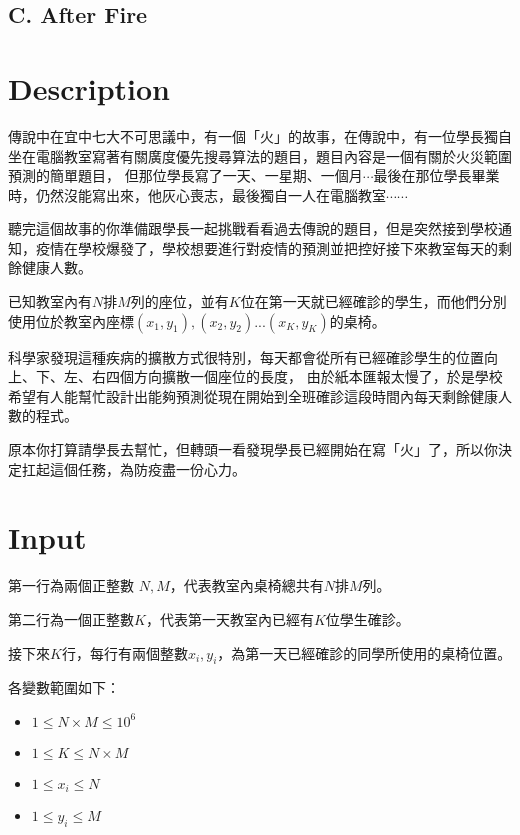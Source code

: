 \documentclass[11pt,a4paper]{article}
\begin{document}
\begin{center}
\section*{C. After Fire}
\end{center}

\section*{Description}


傳說中在宜中七大不可思議中，有一個「火」的故事，在傳說中，有一位學長獨自坐在電腦教室寫著有關廣度優先搜尋算法的題目，題目內容是一個有關於火災範圍預測的簡單題目，
但那位學長寫了一天、一星期、一個月$\cdots$最後在那位學長畢業時，仍然沒能寫出來，他灰心喪志，最後獨自一人在電腦教室$\cdots\cdots$

聽完這個故事的你準備跟學長一起挑戰看看過去傳說的題目，但是突然接到學校通知，疫情在學校爆發了，學校想要進行對疫情的預測並把控好接下來教室每天的剩餘健康人數。

已知教室內有$N$排$M$列的座位，並有$K$位在第一天就已經確診的學生，而他們分別使用位於教室內座標$(x_1, y_1), (x_2, y_2)... (x_K, y_K)$的桌椅。

科學家發現這種疾病的擴散方式很特別，每天都會從所有已經確診學生的位置向上、下、左、右四個方向擴散一個座位的長度，
由於紙本匯報太慢了，於是學校希望有人能幫忙設計出能夠預測從現在開始到全班確診這段時間內每天剩餘健康人數的程式。 

原本你打算請學長去幫忙，但轉頭一看發現學長已經開始在寫「火」了，所以你決定扛起這個任務，為防疫盡一份心力。

\section*{Input}

第一行為兩個正整數 $N, M$，代表教室內桌椅總共有$N$排$M$列。

第二行為一個正整數$K$，代表第一天教室內已經有$K$位學生確診。 

接下來$K$行，每行有兩個整數$x_i,y_i$，為第一天已經確診的同學所使用的桌椅位置。

各變數範圍如下：
\begin{itemize}
    \item $1 \le N \times M \le 10^6$
    \item $1 \le K \le N \times M$
    \item $1 \le x_i \leq N$
    \item $1 \le y_i \leq M$
\end{itemize}\
\end{document}

